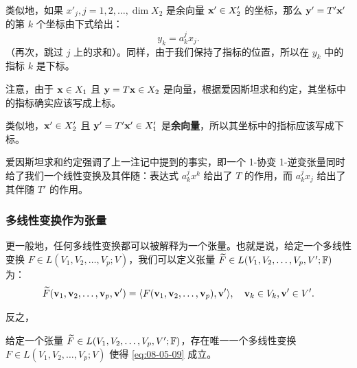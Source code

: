 类似地，如果 $x'_j, j = 1, 2, \dots, \dim X_2$ 是余向量 $\mathbf{x}' \in X'_2$ 的坐标，那么 $\mathbf{y}' = T'\mathbf{x}'$ 的第 $k$ 个坐标由下式给出：
$$ y_k = a^j_k x_j .$$
（再次，跳过 $j$ 上的求和）。同样，由于我们保持了指标的位置，所以在 $y_k$ 中的指标 $k$ 是下标。

注意，由于 $\mathbf{x} \in X_1$ 且 $\mathbf{y} = T\mathbf{x} \in X_2$ 是向量，根据爱因斯坦求和约定，其坐标中的指标确实应该写成上标。

类似地，$\mathbf{x}' \in X'_2$ 且 $\mathbf{y}' = T'\mathbf{x}' \in X'_1$ 是\textbf{余向量}，所以其坐标中的指标应该写成下标。

爱因斯坦求和约定强调了上一注记中提到的事实，即一个 1-协变 1-逆变张量同时给了我们一个线性变换及其伴随：表达式 $a^j_k x^k$ 给出了 $T$ 的作用，而 $a^j_k x_j$ 给出了其伴随 $T'$ 的作用。

\subsubsection{多线性变换作为张量}\label{sec:08-05-03-02}
更一般地，任何多线性变换都可以被解释为一个张量。也就是说，给定一个多线性变换 $F \in L(V_1, V_2, \dots, V_p; V)$，我们可以定义张量 $\widetilde{F} \in L(V_1, V_2, \dots, V_p, V'; \mathbb{F})$ 为：
\begin{equation}\label{eq:08-05-09}
\widetilde{F}(\mathbf{v}_1, \mathbf{v}_2, \dots, \mathbf{v}_p, \mathbf{v}') = \langle F(\mathbf{v}_1, \mathbf{v}_2, \dots, \mathbf{v}_p), \mathbf{v}' \rangle, \quad \mathbf{v}_k \in V_k, \mathbf{v}' \in V'.
\end{equation}

反之，

\begin{proposition}\label{stmt:08-05-06}
给定一个张量 $\widetilde{F} \in L(V_1, V_2, \dots, V_p, V'; \mathbb{F})$，存在唯一一个多线性变换 $F \in L(V_1, V_2, \dots, V_p; V)$ 使得 \eqref{eq:08-05-09} 成立。
\end{proposition}

